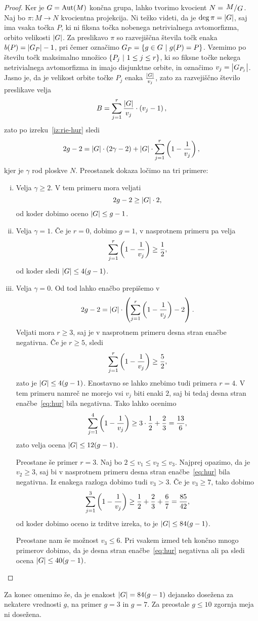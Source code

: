 \begin{proof}
Ker je $G = \operatorname{Aut}(M)$ končna grupa, lahko tvorimo kvocient
$N = \kvoc{M}{G}$. Naj bo $\pi \colon M \to N$ kvocientna
projekcija. Ni težko videti, da je $\deg \pi = \left\lvert G\right\rvert$, saj ima
vsaka točka $P$, ki ni fiksna točka nobenega netrivialnega
avtomorfizma, orbito velikosti $\left\lvert G\right\rvert$. Za preslikavo $\pi$ so
razvejiščna števila točk enaka $b(P) = \left\lvert G_P\right\rvert - 1$, pri čemer
označimo $G_P = \left\{g \in G~\middle\vert~g(P) = P\right\}$. Vzemimo po številu točk
maksimalno množico $\left\{P_j~\middle\vert~1 \leq j \leq r\right\}$, ki so fiksne
točke nekega netrivialnega avtomorfizma in imajo disjunktne orbite,
in označimo $v_j = \left\lvert G_{P_j}\right\rvert$. Jasno je, da je velikost orbite
točke $P_j$ enaka $\frac{\left\lvert G\right\rvert}{v_j}$, zato za razvejiščno
število preslikave velja
\[
B = \sum_{j=1}^r \frac{\left\lvert G\right\rvert}{v_j} \cdot \left(v_j - 1\right),
\]
zato po izreku~\ref{iz:rie-hur} sledi
\[
2g - 2 = \left\lvert G\right\rvert \cdot (2 \gamma - 2) +
\left\lvert G\right\rvert \cdot \sum_{j=1}^r \left(1 - \frac{1}{v_j}\right),
\]
kjer je $\gamma$ rod ploskve $N$. Preostanek dokaza ločimo na tri
primere:

\begin{enumerate}[i)]
\item Velja $\gamma \geq 2$. V tem primeru mora veljati
\[
2g - 2 \geq \left\lvert G\right\rvert \cdot 2,
\]
od koder dobimo oceno $\left\lvert G\right\rvert \leq g-1$.

\item Velja $\gamma = 1$. Če je $r=0$, dobimo $g=1$, v nasprotnem
primeru pa velja
\[
\sum_{j=1}^r \left(1 - \frac{1}{v_j}\right) \geq \frac{1}{2},
\]
od koder sledi $\left\lvert G\right\rvert \leq 4(g-1)$.

\item Velja $\gamma = 0$. Od tod lahko enačbo prepišemo v
\begin{equation}\label{eq:hur}
2g - 2 =
\left\lvert G\right\rvert \cdot \left(\sum_{j=1}^r \left(1 - \frac{1}{v_j}\right) - 2\right).
\end{equation}
Veljati mora $r \geq 3$, saj je v nasprotnem primeru desna stran
enačbe negativna. Če je $r \geq 5$, sledi
\[
\sum_{j=1}^r \left(1 - \frac{1}{v_j}\right) \geq \frac{5}{2},
\]
zato je $\left\lvert G\right\rvert \leq 4(g-1)$. Enostavno se lahko znebimo tudi
primera $r=4$. V tem primeru namreč ne morejo vsi $v_j$ biti enaki
$2$, saj bi tedaj desna stran enačbe~\eqref{eq:hur} bila negativna.
Tako lahko ocenimo
\[
\sum_{j=1}^4 \left(1 - \frac{1}{v_j}\right) \geq
3 \cdot \frac{1}{2} + \frac{2}{3} =
\frac{13}{6},
\]
zato velja ocena $\left\lvert G\right\rvert \leq 12(g-1)$.

Preostane še primer $r=3$. Naj bo $2 \leq v_1 \leq v_2 \leq v_3$.
Najprej opazimo, da je $v_2 \geq 3$, saj bi v nasprotnem primeru
desna stran enačbe~\eqref{eq:hur} bila negativna. Iz enakega
razloga dobimo tudi $v_3 > 3$. Če je $v_3 \geq 7$, tako dobimo
\[
\sum_{j=1}^3 \left(1 - \frac{1}{v_j}\right) \geq
\frac{1}{2} + \frac{2}{3} + \frac{6}{7} = \frac{85}{42},
\]
od koder dobimo oceno iz trditve izreka, to je
$\left\lvert G\right\rvert \leq 84(g-1)$.

Preostane nam še možnost $v_3 \leq 6$. Pri vsakem izmed teh končno
mnogo primerov dobimo, da je desna stran enačbe~\eqref{eq:hur}
negativna ali pa sledi ocena $\left\lvert G\right\rvert \leq 40(g-1)$. \qedhere
\end{enumerate}
\end{proof}

Za konec omenimo še, da je enakost $\left\lvert G\right\rvert = 84 (g-1)$ dejansko
dosežena za nekatere vrednosti $g$, na primer $g = 3$ in $g = 7$.
Za preostale $g \leq 10$ zgornja meja ni dosežena.
